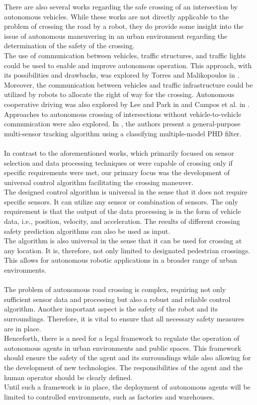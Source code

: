 There are also several works regarding the safe crossing of an intersection by autonomous vehicles. While these works are not directly applicable to the problem of crossing the road by a robot, they do provide some insight into the issue of autonomous maneuvering in an urban environment regarding the determination of the safety of the crossing.\\
The use of communication between vehicles, traffic structures, and traffic lights could be used to enable and improve autonomous operation. This approach, with its possibilities and drawbacks, was explored by Torres and Malikopoulos in \cite{CAV}. Moreover, the communication between vehicles and traffic infrastructure could be utilized by robots to allocate the right of way for the crossing. Autonomous cooperative driving was also explored by Lee and Park in \cite{Lee} and Campos et al. in \cite{Campos}.\\
Approaches to autonomous crossing of intersections without vehicle-to-vehicle communication were also explored. In \cite{CMMPHD}, the authors present a general-purpose multi-sensor tracking algorithm using a classifying multiple-model PHD filter.\\\\
In contrast to the aforementioned works, which primarily focused on sensor selection and data processing techniques or were capable of crossing only if specific requirements were met, our primary focus was the development of universal control algorithm facilitating the crossing maneuver.\\
The designed control algorithm is universal in the sense that it does not require specific sensors. It can utilize any sensor or combination of sensors. The only requirement is that the output of the data processing is in the form of vehicle data, i.e., position, velocity, and acceleration. The results of different crossing safety prediction algorithms can also be used as input.\\
The algorithm is also universal in the sense that it can be used for crossing at any location. It is, therefore, not only limited to designated pedestrian crossings. This allows for autonomous robotic applications in a broader range of urban environments.\\\\
The problem of autonomous road crossing is complex, requiring not only sufficient sensor data and processing but also a robust and reliable control algorithm. Another important aspect is the safety of the robot and its surroundings. Therefore, it is vital to ensure that all necessary safety measures are in place.\\
Henceforth, there is a need for a legal framework to regulate the operation of autonomous agents in urban environments and public spaces. This framework should ensure the safety of the agent and its surroundings while also allowing for the development of new technologies. The responsibilities of the agent and the human operator should be clearly defined.\\
Until such a framework is in place, the deployment of autonomous agents will be limited to controlled environments, such as factories and warehouses.
